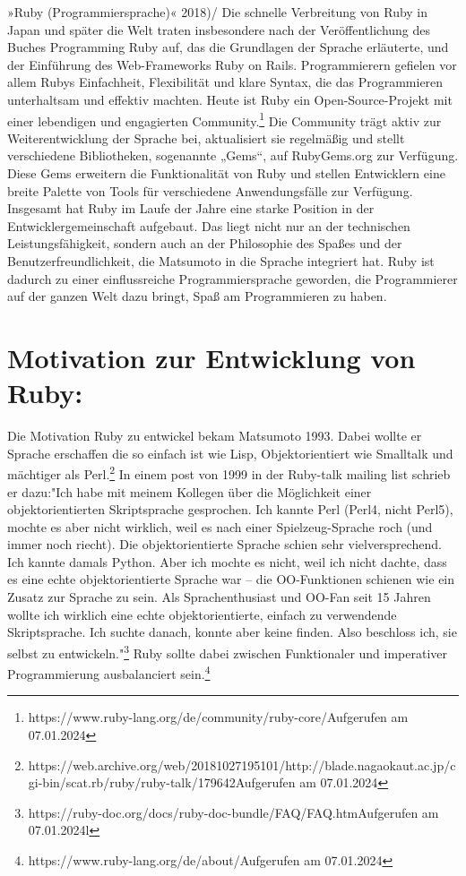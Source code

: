 \documentclass{article}
\begin{document}
{»Ruby (Programmiersprache)« 2018)/} Die schnelle Verbreitung von Ruby in Japan und später die Welt traten insbesondere nach der Veröffentlichung des Buches Programming Ruby auf, das die Grundlagen der Sprache erläuterte, und der Einführung des Web-Frameworks Ruby on Rails. Programmierern gefielen vor allem Rubys Einfachheit, Flexibilität und klare Syntax, die das Programmieren unterhaltsam und effektiv machten. Heute ist Ruby ein Open-Source-Projekt mit einer lebendigen und engagierten Community.\footnote{https://www.ruby-lang.org/de/community/ruby-core/Aufgerufen am 07.01.2024} Die Community trägt aktiv zur Weiterentwicklung der Sprache bei, aktualisiert sie regelmäßig und stellt verschiedene Bibliotheken, sogenannte „Gems“, auf RubyGems.org zur Verfügung. Diese Gems erweitern die Funktionalität von Ruby und stellen Entwicklern eine breite Palette von Tools für verschiedene Anwendungsfälle zur Verfügung. Insgesamt hat Ruby im Laufe der Jahre eine starke Position in der Entwicklergemeinschaft aufgebaut. Das liegt nicht nur an der technischen Leistungsfähigkeit, sondern auch an der Philosophie des Spaßes und der Benutzerfreundlichkeit, die Matsumoto in die Sprache integriert hat. Ruby ist dadurch zu einer einflussreiche Programmiersprache geworden, die Programmierer auf der ganzen Welt dazu bringt, Spaß am Programmieren zu haben.
\section*{Motivation zur Entwicklung von Ruby:}
Die Motivation Ruby zu entwickel bekam Matsumoto 1993. Dabei wollte er Sprache erschaffen die so einfach ist wie Lisp, Objektorientiert wie Smalltalk und mächtiger als Perl.\footnote{https://web.archive.org/web/20181027195101/http://blade.nagaokaut.ac.jp/cgi-bin/scat.rb/ruby/ruby-talk/179642Aufgerufen am 07.01.2024}
In einem post von 1999 in der Ruby-talk mailing list schrieb er dazu:"Ich habe mit meinem Kollegen über die Möglichkeit einer objektorientierten Skriptsprache gesprochen. Ich kannte Perl (Perl4, nicht Perl5), mochte es aber nicht wirklich, weil es nach einer Spielzeug-Sprache roch (und immer noch riecht). Die objektorientierte Sprache schien sehr vielversprechend. Ich kannte damals Python. Aber ich mochte es nicht, weil ich nicht dachte, dass es eine echte objektorientierte Sprache war – die OO-Funktionen schienen wie ein Zusatz zur Sprache zu sein. Als Sprachenthusiast und OO-Fan seit 15 Jahren wollte ich wirklich eine echte objektorientierte, einfach zu verwendende Skriptsprache. Ich suchte danach, konnte aber keine finden. Also beschloss ich, sie selbst zu entwickeln."\footnote{https://ruby-doc.org/docs/ruby-doc-bundle/FAQ/FAQ.htmAufgerufen am 07.01.2024l}
Ruby sollte dabei zwischen Funktionaler und imperativer Programmierung ausbalanciert sein.\footnote{https://www.ruby-lang.org/de/about/Aufgerufen am 07.01.2024}
\end{document}

